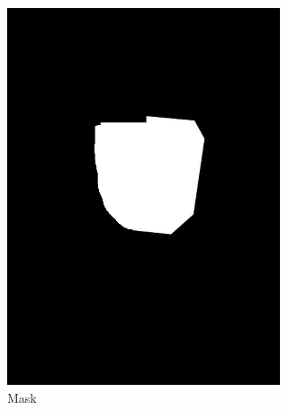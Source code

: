 \documentclass[a4paper]{article}
\begin{document}
{\begin{figure}[H]
\begin{subfigure}[b]{0.2\linewidth}
			\includegraphics[width=\linewidth]{images/Picture4.png}
			\caption*{Mask}
		\end{subfigure}
		\begin{subfigure}[b]{0.2\linewidth}

\end{subfigure}
\end{figure}}
\end{document}
